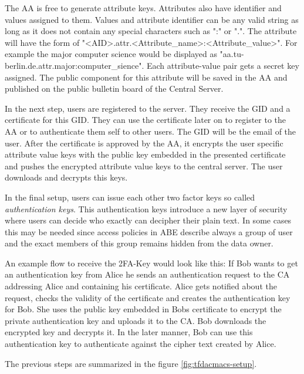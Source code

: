 The AA is free to generate attribute keys. Attributes also have identifier and values assigned to them. Values and attribute identifier can be any valid string as long as it does not contain any special characters such as ":" or ".". The attribute will have the form of "<AID>.attr.<Attribute\_name>:<Attribute\_value>". For example the major computer science would be displayed as "aa.tu-berlin.de.attr.major:computer\_sience". Each attribute-value pair gets a secret key assigned. The public component for this attribute will be saved in the AA and published on the public bulletin board of the Central Server. 

In the next step, users are registered to the server. They receive the GID and a certificate for this GID. They can use the certificate later on to register to the AA or to authenticate them self to other users. The GID will be the email of the user. After the certificate is approved by the AA, it encrypts the user specific attribute value keys with the public key embedded in the presented certificate and pushes the encrypted attribute value keys to the central server. The user downloads and decrypts this keys. 

In the final setup, users can issue each other two factor keys so called \textit{authentication keys}. This authentication keys introduce a new layer of security where users can decide who exactly can decipher their plain text. In some cases this may be needed since access policies in ABE describe always a group of user and the exact members of this group remains hidden from the data owner.
 
An example flow to receive the 2FA-Key would look like this: If Bob wants to get an authentication key from Alice he sends an authentication request to the CA addressing Alice and containing his certificate. Alice gets notified about the request, checks the validity of the certificate and creates the authentication key for Bob. She  uses the public key embedded in Bobs certificate to encrypt the private authentication key and uploads it to the CA. Bob downloads the encrypted key and decrypts it. In the later manner, Bob can use this authentication key to authenticate against the cipher text created by Alice. 

The previous steps are summarized in the figure \ref{fig:tfdacmacs-setup}.

